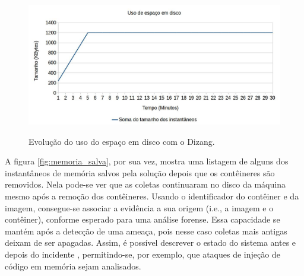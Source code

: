 \documentclass[conference]{IEEEtran}
\newcommand{\fancyname}{Dizang}
\begin{document}

\begin{figure}[htb!]
\caption{Evolução do uso do espaço em disco com o \fancyname.}
\includegraphics[scale=0.30]{evolucao_coleta.jpg}
\centering
\label{fig:evolucao_coleta}
\end{figure}




A figura \ref{fig:memoria_salva}, por sua vez, mostra uma listagem de alguns dos instantâneos de memória salvos pela solução depois que os contêineres são removidos. 
%
Nela pode-se ver que as coletas continuaram no disco da máquina mesmo após a remoção dos contêineres. 
%
Usando o identificador do contêiner e da imagem, consegue-se associar a evidência a sua origem (i.e., a imagem e o contêiner), conforme esperado para uma análise forense.
%
Essa capacidade se mantém após a detecção de uma ameaça, pois nesse caso coletas mais antigas deixam de ser apagadas.
%
Assim, é possível descrever o estado do sistema antes e depois do incidente \cite{Case_Memory_Forensics:2014}, permitindo-se, por exemplo, que ataques de injeção de código em memória sejam analisados.
\end{document}
